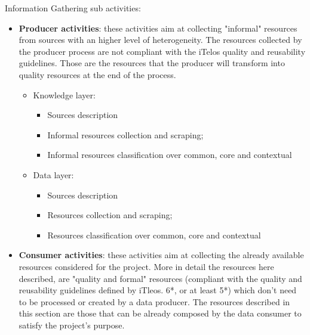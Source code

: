 \noindent Information Gathering sub activities:
\begin{itemize}
    \item \textbf{Producer activities}: these activities aim at collecting "informal" resources from sources with an higher level of heterogeneity. The resources collected by the producer process are not compliant with the iTelos quality and reusability guidelines. Those are the resources that the producer will transform into quality resources at the end of the process.
    \begin{itemize}
        \item Knowledge layer:
        \begin{itemize}
            \item Sources description
            \item Informal resources collection and scraping;
            \item Informal resources classification over common, core and contextual
        \end{itemize}
        \item Data layer:
        \begin{itemize}
            \item Sources description
            \item Resources collection and scraping;
            \item Resources classification over common, core and contextual
        \end{itemize}
    \end{itemize}

    \item \textbf{Consumer activities}: these activities aim at collecting the already available resources considered for the project. More in detail the resources here described, are "quality and formal" resources (compliant with the quality and reusability guidelines defined by iTleos. 6*, or at least  5*) which don't need to be processed or created by a data producer. The resources described in this section are those that can be already composed by the data consumer to satisfy the project's purpose.
    

\end{itemize}
